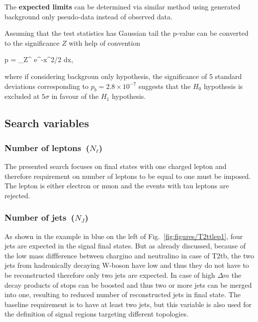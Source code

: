 The \textbf{expected limits} can be determined via similar method using generated background only pseudo-data instead of observed data. 

Assuming that the test statistics has Gaussian tail  the p-value can be converted to the significance $Z$ with help of convention

{
 p = \int_Z^{\infty}  e^{-x^{2}/2} dx,
}

where if considering backgroun only hypothesis, the significance of 5 standard deviations corresponding to $p_{b} = 2.8 \times 10^{-7} $ suggests that the $H_{0}$ hypothesis is excluded at $5 \sigma$ in favour of the $H_{1}$ hypothesis. %

\subsection{Search variables~\label{sec:variables}}

\subsubsection{Number of leptons~($N_{\ell}$)}

The presented search focuses on final states with one charged lepton and therefore requirement on number of leptons to be equal to one must be imposed. The lepton is either electron or muon and the events with tau leptons are rejected.

\subsubsection{Number of jets~($N_{J}$)}

As shown in the example in blue on the left of Fig.~\ref{fig:figures/T2ttlep1}, four jets are expected in the signal final states. But as already discussed, because of the low mass diffference between chargino and neutralino in case of T2tb, the two jets from hadronically decaying W-boson have low \pt and thus they do not have to be reconstructed therefore only two jets are expected. In case of high $\Delta m$ the decay products of stops can be boosted and thus two or more jets can be merged into one, resulting to reduced number of reconstructed jets in final state. The baseline requirement is to have at least two jets, but this variable is also used for the definition of signal regions targeting different topologies.


